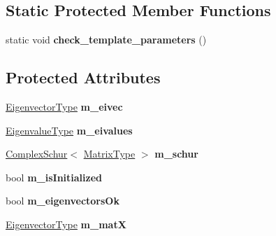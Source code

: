 \subsection*{Static Protected Member Functions}
\begin{DoxyCompactItemize}
\item 
\mbox{\label{class_eigen_1_1_complex_eigen_solver_ad20cfdbbbeb1013d37dc1d82e20405ec}} 
static void {\bfseries check\+\_\+template\+\_\+parameters} ()
\end{DoxyCompactItemize}
\subsection*{Protected Attributes}
\begin{DoxyCompactItemize}
\item 
\mbox{\label{class_eigen_1_1_complex_eigen_solver_a2d507484b14171d4d1137d7f2b04576e}} 
\mbox{\hyperlink{class_eigen_1_1_complex_eigen_solver_a67cd4d20590abfd86b2639c4c8ea3dd6}{Eigenvector\+Type}} {\bfseries m\+\_\+eivec}
\item 
\mbox{\label{class_eigen_1_1_complex_eigen_solver_a2dbb933120321d03761975a2b690a07b}} 
\mbox{\hyperlink{class_eigen_1_1_complex_eigen_solver_ad3a663b1ff5200a098dabbbf9b7162b1}{Eigenvalue\+Type}} {\bfseries m\+\_\+eivalues}
\item 
\mbox{\label{class_eigen_1_1_complex_eigen_solver_abfdd3bc09d7f5f298c3ec8e0a715daab}} 
\mbox{\hyperlink{class_eigen_1_1_complex_schur}{Complex\+Schur}}$<$ \mbox{\hyperlink{class_eigen_1_1_complex_eigen_solver_ad61f6278843a601096276c9a72c0252f}{Matrix\+Type}} $>$ {\bfseries m\+\_\+schur}
\item 
\mbox{\label{class_eigen_1_1_complex_eigen_solver_a50049111bc1de16bd271cdb55e40f87b}} 
bool {\bfseries m\+\_\+is\+Initialized}
\item 
\mbox{\label{class_eigen_1_1_complex_eigen_solver_aaae579b2c6a89d7bdba009bdb89f1a6e}} 
bool {\bfseries m\+\_\+eigenvectors\+Ok}
\item 
\mbox{\label{class_eigen_1_1_complex_eigen_solver_a5af4bbd1177ecb5f6017a98c682862ee}} 
\mbox{\hyperlink{class_eigen_1_1_complex_eigen_solver_a67cd4d20590abfd86b2639c4c8ea3dd6}{Eigenvector\+Type}} {\bfseries m\+\_\+matX}
\end{DoxyCompactItemize}


